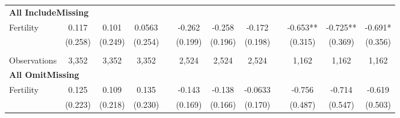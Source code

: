 \begin{landscape}
\begin{table}[htpb!]
\begin{center}
\begin{tabular}{lcccp{2mm}cccp{2mm}ccc}
\multicolumn{12}{l}{\textbf{All IncludeMissing}}\\ 
Fertility&0.117&0.101&0.0563&&-0.262&-0.258&-0.172&&-0.653**&-0.725**&-0.691*\\
&(0.258)&(0.249)&(0.254)&&(0.199)&(0.196)&(0.198)&&(0.315)&(0.369)&(0.356)\\
\begin{footnotesize}\end{footnotesize}&\begin{footnotesize}\end{footnotesize}&\begin{footnotesize}\end{footnotesize}&\begin{footnotesize}\end{footnotesize}&\begin{footnotesize}\end{footnotesize}&\begin{footnotesize}\end{footnotesize}&\begin{footnotesize}\end{footnotesize}&\begin{footnotesize}\end{footnotesize}&\begin{footnotesize}\end{footnotesize}&\begin{footnotesize}\end{footnotesize}&\begin{footnotesize}\end{footnotesize}&\begin{footnotesize}\end{footnotesize}\\Observations&3,352&3,352&3,352&&2,524&2,524&2,524&&1,162&1,162&1,162\\
\multicolumn{12}{l}{\textbf{All OmitMissing}}\\ 
Fertility&0.125&0.109&0.135&&-0.143&-0.138&-0.0633&&-0.756&-0.714&-0.619\\
&(0.223)&(0.218)&(0.230)&&(0.169)&(0.166)&(0.170)&&(0.487)&(0.547)&(0.503)\\

\end{tabular}
\end{center}
\end{table}
\end{landscape}
